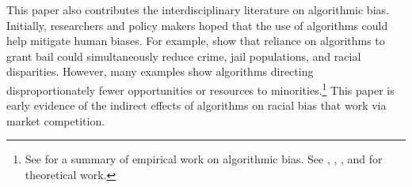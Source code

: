 \documentclass[11pt]{article}
\begin{document}
This paper also contributes the interdisciplinary literature on algorithmic bias.
Initially, researchers and policy makers hoped that the use of algorithms could help mitigate human biases. For example, \citet{kleinberg2018discrimination} show that reliance on algorithms to grant bail could simultaneously reduce crime, jail populations, and racial disparities. However, many examples show algorithms directing disproportionately fewer opportunities or resources to minorities.\footnote{See \citet{smithAlgorithmsBias2021} for a summary of empirical work on algorithmic bias. See \citet{rambachan2019bias}, \citet{Rambachanetal}, \citet{bakalar2021fairness}, \citet{kleinberg_inherent_2016} and \citet{cowgilltucker2019} for theoretical work.} This paper is early evidence of the indirect effects of algorithms on racial bias that work via market competition.
\end{document}
